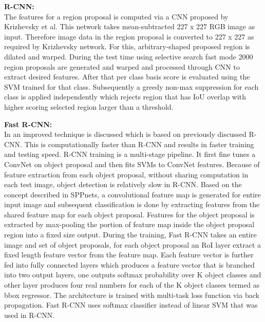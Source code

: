 \newpara \textbf{R-CNN:} \\
The features for a region proposal \cite{girshick2014rich, girshick2015fast, ren2015faster} is computed via a CNN proposed by Krizhevsky et al. This network takes mean-subtracted 227 x 227 RGB image as input. Therefore image data in the region proposal is converted to 227 x 227 as required by Krizhevsky network. For this, arbitrary-shaped  proposed region is dilated and warped. During the test time using selective search fast mode 2000 region proposals are generated and warped and processed through CNN to extract desired features. After that per class basis score is evaluated using the SVM trained for that class. Subsequently a greedy non-max suppression for each class is applied independently which rejects region that has IoU overlap with higher scoring selected region larger than a threshold.

\newpara \textbf{Fast R-CNN:} \\
In \cite{girshick2015fast} an improved technique is discussed which is based on previously discussed R-CNN. This is computationally faster than R-CNN and results in faster training and testing speed. R-CNN training is a multi-stage pipeline. It first fine tunes a ConvNet on object proposal and then fits SVMs to ConvNet features. Because of feature extraction from each object proposal, without sharing computation in each test image, object detection is relatively slow in R-CNN. Based on the concept described in SPPnets, a convolutional feature map is generated for entire input image and subsequent classification is done by extracting features from the shared feature map for each object proposal. Features for the object proposal is extracted by max-pooling the portion of feature map inside the  object proposal region into a fixed size output. During the training, Fast R-CNN takes an entire image and set of object proposals, for each object proposal an RoI layer extract a fixed length feature vector from the feature map. Each feature vector is further fed into fully connected layers which produces a feature vector that is branched into two output layers, one outputs softmax probability over K object classes and other layer produces four real numbers for each of the K object classes termed as bbox regressor. The architecture is trained with multi-task loss function via back propagation. Fast R-CNN uses softmax classifier instead of linear SVM that was used in R-CNN.

